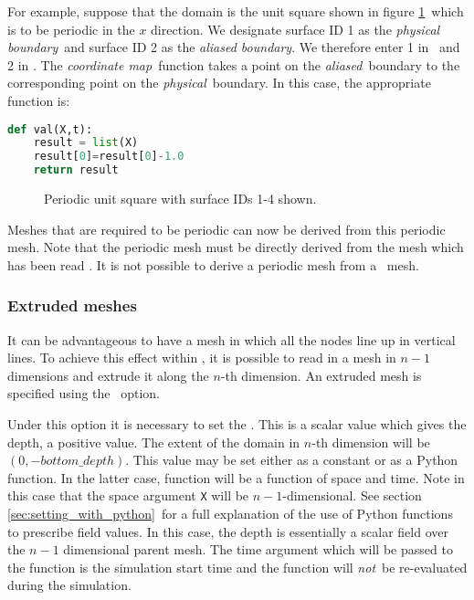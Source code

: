 For example, suppose that the domain is the unit square shown in figure
\ref{fig:periodic}\ which is to be periodic in the $x$ direction. We
designate surface ID 1 as the \emph{physical boundary}\ and surface ID 2 as the
\emph{aliased boundary}. We therefore enter 1 in
\ and 2 in
. The \emph{coordinate map}\ function
takes a point on the \emph{aliased}\ boundary to the corresponding point on
the \emph{physical}\ boundary. In this case, the appropriate function is:
\begin{lstlisting}[language=Python]
def val(X,t):
    result = list(X)
    result[0]=result[0]-1.0
    return result
\end{lstlisting}

\begin{figure}[ht]
  \centering
  \caption{Periodic unit square with surface IDs 1-4 shown.}
  \label{fig:periodic}
\end{figure}

Meshes that are required to be periodic can now be derived from this
periodic mesh. Note that the periodic mesh must be directly derived from the
mesh which has been read . It is not possible to derive a
periodic mesh from a \ mesh.

\subsubsection{Extruded meshes}\label{sec:extruded}

It can be advantageous to have a mesh in which all the nodes line up in
vertical lines. To achieve this effect within \fluidity, it is possible to
read in a mesh in $n-1$ dimensions and extrude it along the $n$-th
dimension. An extruded mesh is specified using the
\ option. 

Under this option it is necessary to set the . This is
a scalar value which gives the depth, a positive value. The extent of the
domain in $n$-th dimension will be $(0,-bottom\_depth)$. This value may be
set either as a constant or as a Python function. In the latter case,
function will be a function of space and time. Note in this case that the
space argument \lstinline[language=Python]+X+ will be $n-1$-dimensional. See
section \ref{sec:setting_with_python}\ for a full explanation of the use of Python functions to
prescribe field values. In this case, the depth is essentially a scalar
field over the $n-1$ dimensional parent mesh. The time argument which
will be passed to the function is the simulation start time and the function
will \emph{not}\ be re-evaluated during the simulation.


